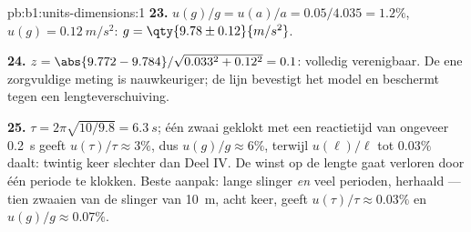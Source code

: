 \begin{solution}{pb:b1:units-dimensions:1}
\textbf{23.} $u(g)/g = u(a)/a = 0.05/4.035 = 1.2\%$, $u(g) =
\qty{0.12}{m/s^2}$: $g = \qty{9.78\pm0.12}{m/s^2}$.

\textbf{24.} $z = \abs{9.772 - 9.784}/\sqrt{0.033^2 + 0.12^2} = 0.1$:
volledig verenigbaar. De ene zorgvuldige meting is nauwkeuriger; de lijn
bevestigt het model en beschermt tegen een lengteverschuiving.

\textbf{25.} $\tau = 2\pi\sqrt{10/9.8} = \qty{6.3}{s}$; één zwaai geklokt
met een reactietijd van ongeveer \qty{0.2}{s} geeft $u(\tau)/\tau \approx
3\%$, dus $u(g)/g \approx 6\%$, terwijl $u(\ell)/\ell$ tot
$0.03\%$ daalt: twintig keer slechter dan Deel IV. De winst op de lengte gaat
verloren door één periode te klokken. Beste aanpak: lange slinger \emph{en} veel
perioden, herhaald --- tien zwaaien van de slinger van \qty{10}{m}, acht
keer, geeft $u(\tau)/\tau \approx 0.03\%$ en $u(g)/g \approx 0.07\%$.
\end{solution}
